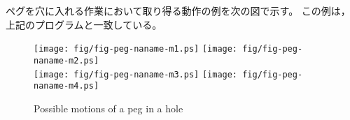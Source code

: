\clearpage
ペグを穴に入れる作業において取り得る動作の例を次の図で示す。
この例は，上記のプログラムと一致している。
\begin{figure}[h]
\begin{center}
\texttt{[image: fig/fig-peg-naname-m1.ps]}
\texttt{[image: fig/fig-peg-naname-m2.ps]}\\
\texttt{[image: fig/fig-peg-naname-m3.ps]}
\texttt{[image: fig/fig-peg-naname-m4.ps]}
\end{center}
\caption{Possible motions of a peg in a hole}
\label{fig:peg-in-a-hole}
\end{figure}

\clearpage
